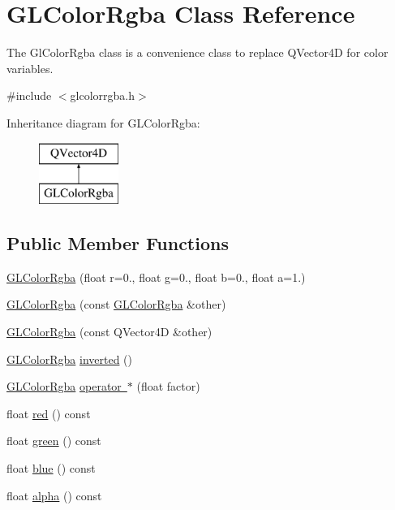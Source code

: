 \hypertarget{class_g_l_color_rgba}{}\section{G\+L\+Color\+Rgba Class Reference}
\label{class_g_l_color_rgba}


The Gl\+Color\+Rgba class is a convenience class to replace Q\+Vector4D for color variables.  




{\ttfamily \#include $<$glcolorrgba.\+h$>$}

Inheritance diagram for G\+L\+Color\+Rgba\+:\begin{figure}[H]
\begin{center}
\leavevmode
\includegraphics[height=2.000000cm]{class_g_l_color_rgba}
\end{center}
\end{figure}
\subsection*{Public Member Functions}
\begin{DoxyCompactItemize}
\item 
\mbox{\hyperlink{class_g_l_color_rgba_a1dfcf62fbdbb63deac8db456a5d8b05d}{G\+L\+Color\+Rgba}} (float r=0., float g=0., float b=0., float a=1.)
\item 
\mbox{\hyperlink{class_g_l_color_rgba_af3580e510acb408439fa87e5d8653f74}{G\+L\+Color\+Rgba}} (const \mbox{\hyperlink{class_g_l_color_rgba}{G\+L\+Color\+Rgba}} \&other)
\item 
\mbox{\hyperlink{class_g_l_color_rgba_a6ffc715b25827505384d7309235baacf}{G\+L\+Color\+Rgba}} (const Q\+Vector4D \&other)
\item 
\mbox{\hyperlink{class_g_l_color_rgba}{G\+L\+Color\+Rgba}} \mbox{\hyperlink{class_g_l_color_rgba_aebd1534aa7987e20cf5bf610a30c812c}{inverted}} ()
\item 
\mbox{\hyperlink{class_g_l_color_rgba}{G\+L\+Color\+Rgba}} \mbox{\hyperlink{class_g_l_color_rgba_acc5aee0e35f3165c535416e408170af5}{operator $\ast$}} (float factor)
\item 
float \mbox{\hyperlink{class_g_l_color_rgba_aae8d243708fe5ebb679ff2b3c1df55b3}{red}} () const
\item 
float \mbox{\hyperlink{class_g_l_color_rgba_a345e39e9aea9ec259b44001e0715d4a7}{green}} () const
\item 
float \mbox{\hyperlink{class_g_l_color_rgba_ab7c2621addaa72a585ad4882a70780d6}{blue}} () const
\item 
float \mbox{\hyperlink{class_g_l_color_rgba_a66d6b14dc626a277e9848fc16230e9c7}{alpha}} () const
\end{DoxyCompactItemize}
